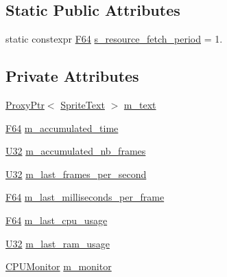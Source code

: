 \subsection*{Static Public Attributes}
\begin{DoxyCompactItemize}
\item 
static constexpr \hyperlink{namespacemage_ad26233bbec640deda836e572c1a23708}{F64} \hyperlink{classmage_1_1script_1_1_stats_script_adad03ab9bd20bde0709365d43a4158fd}{s\+\_\+resource\+\_\+fetch\+\_\+period} = 1.
\end{DoxyCompactItemize}
\subsection*{Private Attributes}
\begin{DoxyCompactItemize}
\item 
\hyperlink{classmage_1_1_proxy_ptr}{Proxy\+Ptr}$<$ \hyperlink{classmage_1_1_sprite_text}{Sprite\+Text} $>$ \hyperlink{classmage_1_1script_1_1_stats_script_a0257952ca11f30ced1d87ee6a93fd245}{m\+\_\+text}
\item 
\hyperlink{namespacemage_ad26233bbec640deda836e572c1a23708}{F64} \hyperlink{classmage_1_1script_1_1_stats_script_a41c1a4a0c73a6d5778b8ac7cd9d41bbc}{m\+\_\+accumulated\+\_\+time}
\item 
\hyperlink{namespacemage_a41c104c036fba3756a74e19f793eeaa1}{U32} \hyperlink{classmage_1_1script_1_1_stats_script_a7ef910aceb585af53110697ea5b3f810}{m\+\_\+accumulated\+\_\+nb\+\_\+frames}
\item 
\hyperlink{namespacemage_a41c104c036fba3756a74e19f793eeaa1}{U32} \hyperlink{classmage_1_1script_1_1_stats_script_a1ce1ed31e122346361d01cefb012e443}{m\+\_\+last\+\_\+frames\+\_\+per\+\_\+second}
\item 
\hyperlink{namespacemage_ad26233bbec640deda836e572c1a23708}{F64} \hyperlink{classmage_1_1script_1_1_stats_script_a6c531ad04b2fa2ce530af06914d362b9}{m\+\_\+last\+\_\+milliseconds\+\_\+per\+\_\+frame}
\item 
\hyperlink{namespacemage_ad26233bbec640deda836e572c1a23708}{F64} \hyperlink{classmage_1_1script_1_1_stats_script_aa139c88470e13a6af4c5d715107c32e6}{m\+\_\+last\+\_\+cpu\+\_\+usage}
\item 
\hyperlink{namespacemage_a41c104c036fba3756a74e19f793eeaa1}{U32} \hyperlink{classmage_1_1script_1_1_stats_script_a0ea0dcf90e4364af1f64d67024314a94}{m\+\_\+last\+\_\+ram\+\_\+usage}
\item 
\hyperlink{classmage_1_1_c_p_u_monitor}{C\+P\+U\+Monitor} \hyperlink{classmage_1_1script_1_1_stats_script_ae5b97f07da7adb0740cd68cf2c4abbf5}{m\+\_\+monitor}
\end{DoxyCompactItemize}

